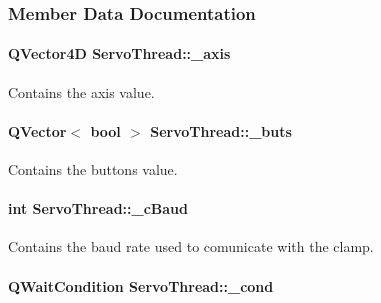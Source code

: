 \subsubsection{Member Data Documentation}
\hypertarget{a00009_a4ddc59272c23925f921e20ee630804c2}{}
\paragraph[{\+\_\+axis}]{\setlength{\rightskip}{0pt plus 5cm}Q\+Vector4\+D Servo\+Thread\+::\+\_\+axis\hspace{0.3cm}{\ttfamily [private]}}\label{a00009_a4ddc59272c23925f921e20ee630804c2}


Contains the axis value. 

\hypertarget{a00009_a6f956f7e0f2953e213ff95fb64857ab0}{}
\paragraph[{\+\_\+buts}]{\setlength{\rightskip}{0pt plus 5cm}Q\+Vector$<$ bool $>$ Servo\+Thread\+::\+\_\+buts\hspace{0.3cm}{\ttfamily [private]}}\label{a00009_a6f956f7e0f2953e213ff95fb64857ab0}


Contains the buttons value. 

\hypertarget{a00009_a9fccfd415e2e55c8abef7fcc6535af30}{}
\paragraph[{\+\_\+c\+Baud}]{\setlength{\rightskip}{0pt plus 5cm}int Servo\+Thread\+::\+\_\+c\+Baud\hspace{0.3cm}{\ttfamily [private]}}\label{a00009_a9fccfd415e2e55c8abef7fcc6535af30}


Contains the baud rate used to comunicate with the clamp. 

\hypertarget{a00009_afcb93c09acd7fecf47d92996a297365c}{}
\paragraph[{\+\_\+cond}]{\setlength{\rightskip}{0pt plus 5cm}Q\+Wait\+Condition Servo\+Thread\+::\+\_\+cond\hspace{0.3cm}{\ttfamily [private]}}\label{a00009_afcb93c09acd7fecf47d92996a297365c}


